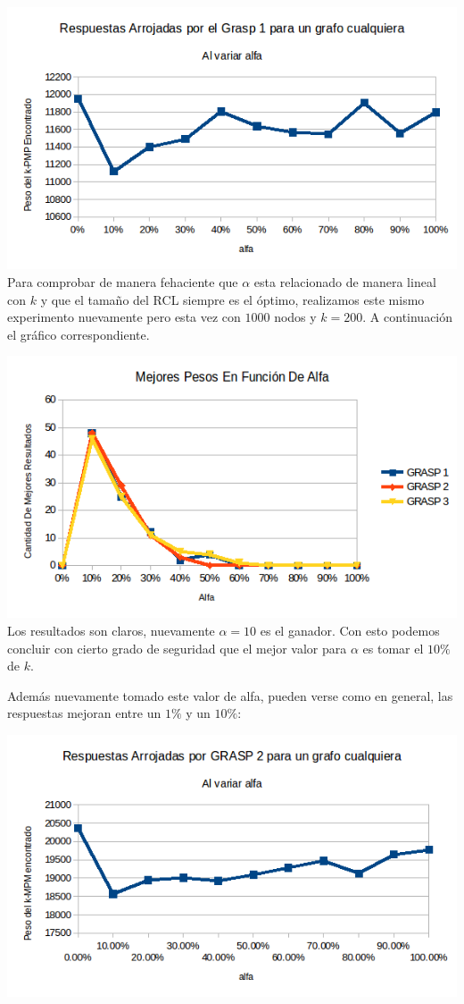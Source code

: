 \includegraphics[scale=0.7]{Ej5/ejemploAlfa1.png}\\

Para comprobar de manera fehaciente que $\alpha$ esta relacionado de manera lineal con $k$ y que el tamaño del RCL siempre es el óptimo, realizamos este mismo experimento nuevamente pero esta vez con $1000$ nodos y $k=200$. A continuación el gráfico correspondiente.

\includegraphics[scale=0.7]{Ej5/respuestasAlfa2.png}\\

Los resultados son claros, nuevamente $\alpha=10$ es el ganador. Con esto podemos concluir con cierto grado de seguridad que el mejor valor para $\alpha$ es tomar el $10\%$ de $k$.

Además nuevamente tomado este valor de alfa, pueden verse como en general, las respuestas mejoran entre un $1 \%$ y un $10 \%$:

\includegraphics[scale=0.7]{Ej5/ejemploAlfa2.png}\\

